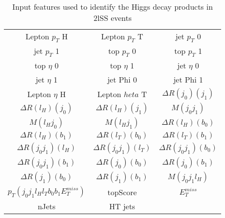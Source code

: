 \begin{table}[H]
  \begin{center}
  \begin{tabular}{ccc}
    \hline\hline
    Lepton  $p_T$ H & Lepton  $p_T$ T & jet  $p_T$ 0 \\
    jet  $p_T$ 1 & top  $p_T$ 0 & top  $p_T$ 1 \\
    top  $\eta$ 0 & top  $\eta$ 1 & jet  $\eta$ 0 \\
    jet  $\eta$ 1 & jet Phi 0 & jet Phi 1 \\
    Lepton  $\eta$ H & Lepton  $heta$ T & $\Delta R(j_0)(j_1)$ \\
    $\Delta R(l_{H})(j_0)$ & $\Delta R(l_{H})(j_1)$ & $M(j_0j_1)$ \\
    $M(l_{H}j_0)$ & $M(l_{H}j_1)$ & $\Delta R(l_{H})(b_0)$ \\
    $\Delta R(l_{H})(b_1)$ & $\Delta R(l_{T})(b_0)$ & $\Delta R(l_{T})(b_1)$ \\
    $\Delta R(j_0j_1)(l_{H})$ & $\Delta R(j_0j_1)(l_{T})$ & $\Delta R(j_0j_1)(b_0)$ \\
    $\Delta R(j_0j_1)(b_1)$ & $\Delta R(j_0)(b_0)$ & $\Delta R(j_0)(b_1)$ \\
    $\Delta R(j_1)(b_0)$ & $\Delta R(j_1)(b_1)$ & $M(j_0j_1l_{H})$ \\
     $p_T(j_0j_1l_{H}l_{T}b_0b_1E_T^{miss})$ & topScore & $E_T^{miss}$ \\
    nJets & HT jets & \\
    \hline
  \end{tabular}
  \end{center}
  \caption{Input features used to identify the Higgs decay products in 2lSS events}
  \label{tab:higgsTop2lSSfeatures}
\end{table}
